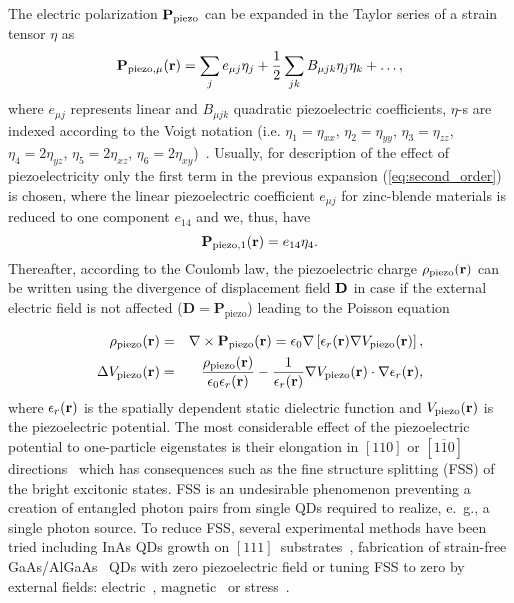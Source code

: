 The electric polarization $\mathbf{P}_{{\rm piezo}}$ can be expanded in the Taylor series of a strain tensor $\eta$ as
\begin{equation}
\mathbf{P}_{{\rm piezo},\mu}(\mathbf{r})=%
\sum_je_{\mu j}\eta_j+\frac{1}{2}\sum_{jk}B_{\mu jk}\eta_j\eta_k+\dots ,\label{eq:second_order}
\end{equation}
where $e_{\mu j}$ represents linear and $B_{\mu jk}$ quadratic piezoelectric coefficients, $\eta$-s are indexed according to the Voigt notation (i.e. $\eta_1=\eta_{xx}$, $\eta_2=\eta_{yy}$, $\eta_3=\eta_{zz}$, $\eta_4=2\eta_{yz}$, $\eta_5=2\eta_{xz}$, $\eta_6=2\eta_{xy}$)~\citep{voigt_notation, Beya-Wakata2011}. 
Usually, for description of the effect of piezoelectricity only the first term in the previous expansion (\ref{eq:second_order}) is chosen, where the linear piezoelectric coefficient $e_{\mu j}$ for zinc-blende materials is reduced to one component $e_{14}$ and we, thus, have
\begin{equation}
\mathbf{P}_{{\rm piezo},1}(\mathbf{r})=%
e_{14 }\eta_4 \label{eq:first_order}.
\end{equation}
%
Thereafter, according to the Coulomb law, the piezoelectric charge $\rho_{\rm piezo}(\bf{r})$ can be written using the divergence of displacement field $\bf{ D}$ in case if the external electric field is not affected ($\mathbf{D}=\mathbf{P}_\mathrm{piezo}$) leading to the Poisson equation

\begin{eqnarray}
\rho_{\rm piezo}(\mathbf{r})&=&\nabla\times\mathbf{P}_{\rm piezo}(\mathbf{r})=\epsilon_0\nabla\left[\epsilon_r(\mathbf{r})\nabla V_{\rm piezo}(\mathbf{r})\right],\\
\Delta V_{\rm piezo}(\mathbf{r})&=&\frac{\rho_{\rm piezo}(\mathbf{r})}{\epsilon_0\epsilon_r(\mathbf{r})}-\frac{1}{\epsilon_r(\mathbf{r})}\nabla V_{\rm piezo}(\mathbf{r})\cdot\nabla\epsilon_r(\mathbf{r}),
\end{eqnarray}
%
where $\epsilon_r(\bf{r})$ is the spatially dependent static dielectric function and $V_{\rm piezo}(\bf{r})$ is the piezoelectric potential. The most considerable effect of the piezoelectric potential to one-particle eigenstates is their elongation in $[110]$ or $[1\overline{1}0]$ directions~\citep{Stier1999} which has consequences such as the fine structure splitting (FSS) of the bright excitonic states. FSS is an undesirable phenomenon preventing a creation of entangled photon pairs from single QDs required to realize, e.~g., a single photon source. To reduce FSS, several experimental methods have been tried including InAs QDs growth on $[111]$~substrates~\citep{StockFSS}, fabrication of strain-free GaAs/AlGaAs~\citep{Abbarchi_2008} QDs with zero piezoelectric field or tuning FSS to zero by external fields: electric~\citep{Gerardot_2007, Vogel_2007}, magnetic~\citep{Stevenson_2006} or stress~\citep{kleDresden}. 

